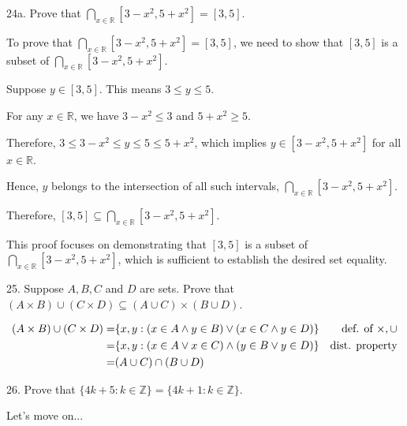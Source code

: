\documentclass{idrisMemo}
\begin{document}
\begin{prooflist}{24a. Prove that $\bigcap_{x \in \mathbb{R}}\left[3-x^2, 5+x^2\right]=[3,5]$.}
\item
To prove that $\bigcap_{x \in \mathbb{R}}\left[3-x^2, 5+x^2\right]=[3,5]$, we need to show that $[3,5]$ is a subset of $\bigcap_{x \in \mathbb{R}}\left[3-x^2, 5+x^2\right]$.

\item Suppose $y \in [3,5]$. This means $3 \leq y \leq 5$.

\item For any $x \in \mathbb{R}$, we have $3 - x^2 \leq 3$ and $5 + x^2 \geq 5$.

\item Therefore, $3 \leq 3 - x^2 \leq y \leq 5 \leq 5 + x^2$, which implies $y \in \left[3-x^2, 5+x^2\right]$ for all $x \in \mathbb{R}$.

\item Hence, $y$ belongs to the intersection of all such intervals, $\bigcap_{x \in \mathbb{R}}\left[3-x^2, 5+x^2\right]$.

\item Therefore, $[3,5] \subseteq \bigcap_{x \in \mathbb{R}}\left[3-x^2, 5+x^2\right]$.

\end{prooflist}

This proof focuses on demonstrating that $[3,5]$ is a subset of $\bigcap_{x \in \mathbb{R}}\left[3-x^2, 5+x^2\right]$, which is sufficient to establish the desired set equality.

\begin{prooflist}{25. Suppose $A, B, C$ and $D$ are sets. Prove that $(A \times
    B) \cup(C \times D) \subseteq(A \cup C) \times(B \cup D)$.} \item
\begin{align*}
    (A\times B)\cup (C\times D)=& \{x, y: (x\in A \land y\in B) \lor (x\in C
    \land y\in D) \} & \text{def. of }\times,\cup\\
    =& \{x,y: (x\in A \lor x\in C) \land (y\in B \lor y\in D) \} & \text{dist.
    property}\\
    =& (A\cup C) \cap (B\cup D)
\end{align*}
\end{prooflist}

\begin{prooflist}{26. Prove that $\{4 k+5: k \in \mathbb{Z}\}=\{4 k+1: k \in \mathbb{Z}\}$.}
\item
    Let's move on...
\end{prooflist}
\end{document}
